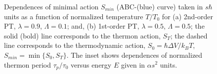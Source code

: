 \documentclass[aps, pre, preprint, groupedaddress, superscriptaddress, showkeys, showpacs] {revtex4-1}
\begin{document}
%
\begin{figure}[ht]
\begin{minipage}[h]{0.49\linewidth}
\end{minipage}
\hfill
\begin{minipage}[h]{0.49\linewidth}
\end{minipage}
\caption{Dependences of  minimal action $S_{min}$ (ABC-(blue) curve) taken in $s\hbar$ units as a function of normalized temperature $ T/T_{0}$ for (a) 2nd-order PT, $\lambda = 0.9$, $\Lambda = 0.1$; and, (b) 1st-order PT, $\lambda = 0.5$, $\Lambda = 0.5$; the solid (bold) line corresponds to the thermon action, $S_T$; the dashed line corresponds to the thermodynamic action, $S_0 = \hbar \Delta V / k_B T$, $S_{min} = \min \{S_0, S_T\}$. The inset shows dependences of normalized thermon period $\tau_p / \tau_0$ versus energy $E$ given in  $\alpha s^2$ units. 
\label{pic:action_period}}
\end{figure}
%
 
\end{document}
